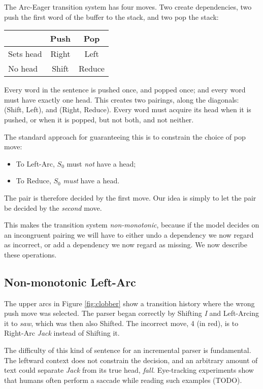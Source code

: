 \documentclass[11pt,letterpaper]{article}
\begin{document}
The Arc-Eager transition system \citep{nivre:04} has four moves. Two create 
dependencies, two push the first word of the buffer to the stack, and two pop 
the stack:

\begin{center}
    \begin{tabular}{l|cc}
             & Push  & Pop    \\
           \hline
 Sets head   & Right & Left    \\
  No head    & Shift & Reduce   \\
     \end{tabular}
\end{center}

Every word in the sentence is pushed once, and popped once; and every
word must have exactly one head. This creates two pairings, along the
diagonals: (Shift, Left), and (Right, Reduce). Every word must acquire
its head when it is pushed, or when it is popped, but not both, and not neither.

The standard approach for guaranteeing this is to constrain the choice of pop move:

\begin{itemize}\setlength{\itemsep}{-2mm}
    \item To Left-Arc, $S_0$ must \emph{not} have a head;
    \item To Reduce, $S_0$ \emph{must} have a head.
\end{itemize}
The pair is therefore decided by the first move.
Our idea is simply to let the pair be decided by the \emph{second} move.

This makes the transition system \emph{non-monotonic}, because if the model decides
on an incongruent pairing
we will have to either undo a dependency we now regard as incorrect, or add a
dependency we now regard as missing. We now describe these operations.

\subsection{Non-monotonic Left-Arc}

The upper arcs in Figure \ref{fig:clobber} show a transition history where the wrong
push move was selected. The parser began correctly by Shifting \emph{I}
and Left-Arcing it to \emph{saw}, which was then also Shifted. The incorrect move,
4 (in red), is to Right-Arc \emph{Jack} instead of Shifting it.

The difficulty of this kind of sentence for an incremental parser is fundamental.
The leftward context does not constrain the decision, 
and an arbitrary amount of text could separate \emph{Jack} from its true head,
\emph{fall}. Eye-tracking
experiments show that humans often perform a saccade while reading such examples (TODO).
\end{document}
